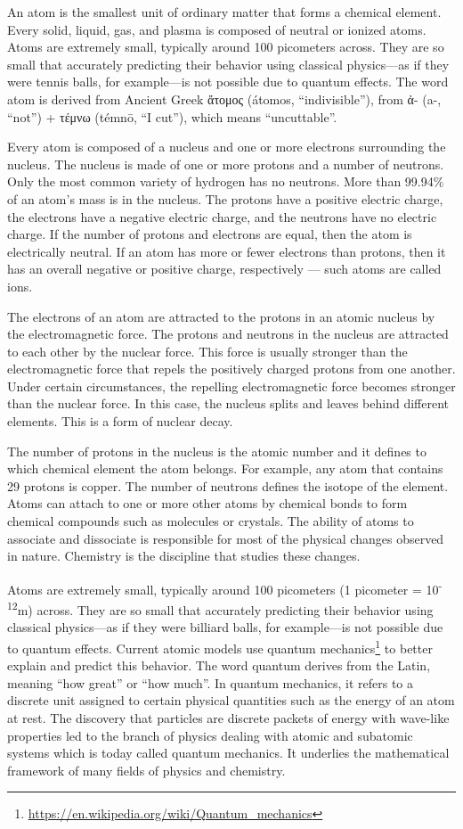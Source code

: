 \documentclass[
]{article}
\let\rmarkdownfootnote\footnote%
\def\footnote{\protect\rmarkdownfootnote}
\renewcommand{\href}[2]{#2\footnote{\url{#1}}}
\theoremstyle{definition}
\theoremstyle{definition}
\theoremstyle{definition}
\theoremstyle{remark}
\begin{document}
An atom is the smallest unit of ordinary matter that forms a chemical
element. Every solid, liquid, gas, and plasma is composed of neutral or
ionized atoms. Atoms are extremely small, typically around 100
picometers across. They are so small that accurately predicting their
behavior using classical physics---as if they were tennis balls, for
example---is not possible due to quantum effects. The word atom is
derived from Ancient Greek ἄτομος (átomos, ``indivisible''), from ἀ-
(a-, ``not'') + τέμνω (témnō, ``I cut''), which means ``uncuttable''.

Every atom is composed of a nucleus and one or more electrons
surrounding the nucleus. The nucleus is made of one or more protons and
a number of neutrons. Only the most common variety of hydrogen has no
neutrons. More than 99.94\% of an atom's mass is in the nucleus. The
protons have a positive electric charge, the electrons have a negative
electric charge, and the neutrons have no electric charge. If the number
of protons and electrons are equal, then the atom is electrically
neutral. If an atom has more or fewer electrons than protons, then it
has an overall negative or positive charge, respectively --- such atoms
are called ions.

The electrons of an atom are attracted to the protons in an atomic
nucleus by the electromagnetic force. The protons and neutrons in the
nucleus are attracted to each other by the nuclear force. This force is
usually stronger than the electromagnetic force that repels the
positively charged protons from one another. Under certain
circumstances, the repelling electromagnetic force becomes stronger than
the nuclear force. In this case, the nucleus splits and leaves behind
different elements. This is a form of nuclear decay.

The number of protons in the nucleus is the atomic number and it defines
to which chemical element the atom belongs. For example, any atom that
contains 29 protons is copper. The number of neutrons defines the
isotope of the element. Atoms can attach to one or more other atoms by
chemical bonds to form chemical compounds such as molecules or crystals.
The ability of atoms to associate and dissociate is responsible for most
of the physical changes observed in nature. Chemistry is the discipline
that studies these changes.

Atoms are extremely small, typically around 100 picometers (1 picometer
= 10\textsuperscript{-12}m) across. They are so small that accurately
predicting their behavior using classical physics---as if they were
billiard balls, for example---is not possible due to quantum effects.
Current atomic models use
\href{https://en.wikipedia.org/wiki/Quantum_mechanics}{quantum
mechanics} to better explain and predict this behavior. The word quantum
derives from the Latin, meaning ``how great'' or ``how much''. In
quantum mechanics, it refers to a discrete unit assigned to certain
physical quantities such as the energy of an atom at rest. The discovery
that particles are discrete packets of energy with wave-like properties
led to the branch of physics dealing with atomic and subatomic systems
which is today called quantum mechanics. It underlies the mathematical
framework of many fields of physics and chemistry.
\end{document}
